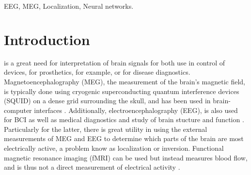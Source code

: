 \documentclass[journal]{IEEEtran}
\begin{document}
\begin{IEEEkeywords}
EEG, MEG, Localization, Neural networks.
\end{IEEEkeywords}






%
\IEEEpeerreviewmaketitle



\section{Introduction}

 is a great need for interpretation of brain signals for both use in control of devices, for prosthetics, for example, or for disease diagnostics. Magnetoencephalography (MEG), the measurement of the brain's magnetic field, is typically done using cryogenic superconducting quantum interference devices (SQUID) on a dense grid surrounding the skull, and has been used in brain-computer interfaces \cite{mellinger2007meg}. Additionally, electroencephalography (EEG), is also used for BCI as well as medical diagnostics and study of brain stucture and function \cite{da2008impact}. Particularly for the latter, there is great utility in using the external measurements of MEG and EEG to determine which parts of the brain are most electrically active, a problem know as localization or inversion. Functional magnetic resonance imaging (fMRI) can be used but instead measures blood flow, and is thus not a direct measurement of electrical activity \cite{sharon2007advantage}.
\end{document}

